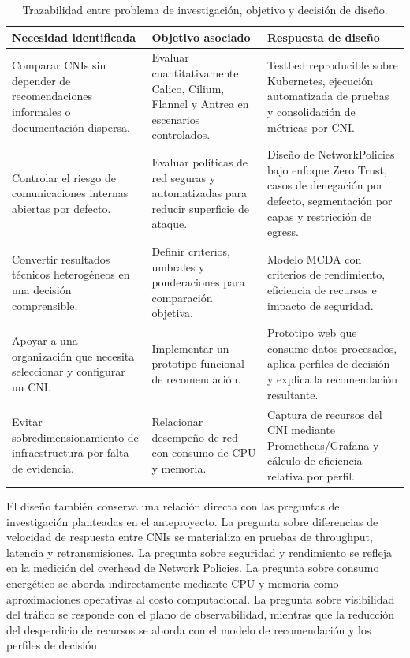 \documentclass[journal]{IEEEtran}
\begin{document}
\begin{table}[htbp]
\centering
\scriptsize
\caption{Trazabilidad entre problema de investigación, objetivo y decisión de diseño.}
\label{tab:trazabilidad-diseno}
\begin{tabularx}{\textwidth}{|Y|Y|Y|}
\hline
\textbf{Necesidad identificada} & \textbf{Objetivo asociado} & \textbf{Respuesta de diseño} \\
\hline
Comparar CNIs sin depender de recomendaciones informales o documentación dispersa. & Evaluar cuantitativamente Calico, Cilium, Flannel y Antrea en escenarios controlados. & Testbed reproducible sobre Kubernetes, ejecución automatizada de pruebas y consolidación de métricas por CNI. \\
\hline
Controlar el riesgo de comunicaciones internas abiertas por defecto. & Evaluar políticas de red seguras y automatizadas para reducir superficie de ataque. & Diseño de NetworkPolicies bajo enfoque Zero Trust, casos de denegación por defecto, segmentación por capas y restricción de egress. \\
\hline
Convertir resultados técnicos heterogéneos en una decisión comprensible. & Definir criterios, umbrales y ponderaciones para comparación objetiva. & Modelo MCDA con criterios de rendimiento, eficiencia de recursos e impacto de seguridad. \\
\hline
Apoyar a una organización que necesita seleccionar y configurar un CNI. & Implementar un prototipo funcional de recomendación. & Prototipo web que consume datos procesados, aplica perfiles de decisión y explica la recomendación resultante. \\
\hline
Evitar sobredimensionamiento de infraestructura por falta de evidencia. & Relacionar desempeño de red con consumo de CPU y memoria. & Captura de recursos del CNI mediante Prometheus/Grafana y cálculo de eficiencia relativa por perfil. \\
\hline
\end{tabularx}
\end{table}

El diseño también conserva una relación directa con las preguntas de investigación planteadas en el anteproyecto. La pregunta sobre diferencias de velocidad de respuesta entre CNIs se materializa en pruebas de throughput, latencia y retransmisiones. La pregunta sobre seguridad y rendimiento se refleja en la medición del overhead de Network Policies. La pregunta sobre consumo energético se aborda indirectamente mediante CPU y memoria como aproximaciones operativas al costo computacional. La pregunta sobre visibilidad del tráfico se responde con el plano de observabilidad, mientras que la reducción del desperdicio de recursos se aborda con el modelo de recomendación y los perfiles de decisión \cite{ref29}.
\end{document}
